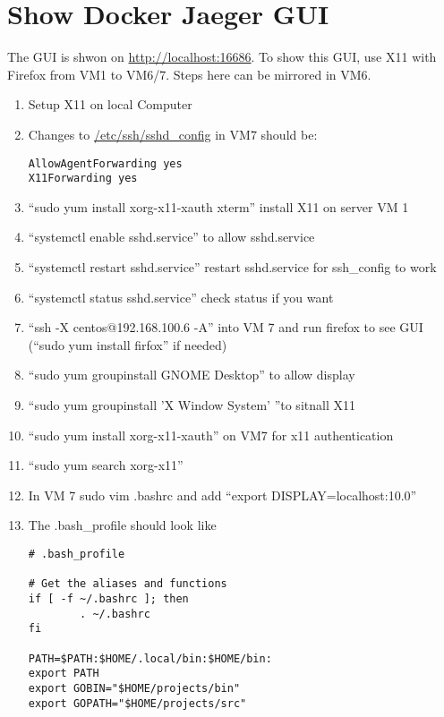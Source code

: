 \documentclass[10pt,twocolumn,letterpaper]{article}
\begin{document}
\section{Show Docker Jaeger GUI}
The GUI is shwon on \url{http://localhost:16686}. To show this GUI, use X11 with Firefox from VM1 to VM6/7.
Steps here can be mirrored in VM6.
\begin{enumerate}
	\item Setup X11 on local Computer
	\item Changes to \url{/etc/ssh/sshd_config} in VM7 should be: \begin{lstlisting}
AllowAgentForwarding yes
X11Forwarding yes
	\end{lstlisting}
	\item ``sudo yum install xorg-x11-xauth xterm'' install X11 on server VM 1
	\item ``systemctl enable sshd.service'' to allow sshd.service
	\item ``systemctl restart sshd.service'' restart sshd.service for ssh\_config to work
	\item ``systemctl status sshd.service''  check status if you want
	\item ``ssh -X centos@192.168.100.6 -A'' into VM 7 and run firefox to see GUI (``sudo yum install firfox'' if needed)
	\item ``sudo yum groupinstall GNOME Desktop'' to allow display 
	\item ``sudo yum groupinstall 'X Window System' ''to sitnall X11
	\item ``sudo yum install xorg-x11-xauth'' on VM7 for x11 authentication
	\item ``sudo yum search xorg-x11''
	\item In VM 7 sudo vim .bashrc and add ``export DISPLAY=localhost:10.0''
	\item The .bash\_profile  should look like \begin{lstlisting}
# .bash_profile

# Get the aliases and functions
if [ -f ~/.bashrc ]; then
        . ~/.bashrc
fi

PATH=$PATH:$HOME/.local/bin:$HOME/bin:
export PATH
export GOBIN="$HOME/projects/bin"
export GOPATH="$HOME/projects/src"
	\end{lstlisting}

\end{enumerate}
\end{document}
